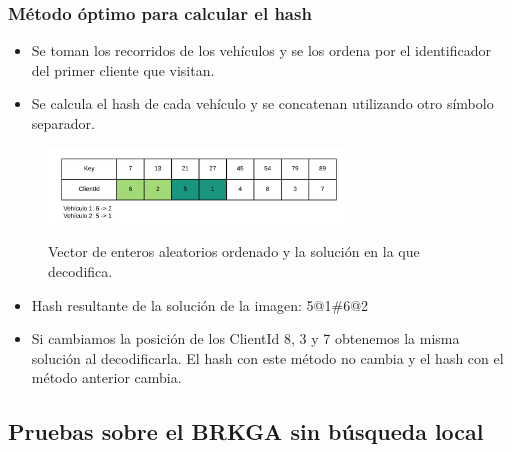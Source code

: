 \documentclass{beamer}
\begin{document}
\begin{frame}
\frametitle{Método óptimo para calcular el hash}

\begin{itemize}
    \item Se toman los recorridos de los vehículos y se los ordena por el identificador del primer cliente que visitan. 
    \item Se calcula el hash de cada vehículo y se concatenan utilizando otro símbolo separador.
    \pause
\end{itemize}

\begin{figure}[h]
	\caption{Vector de enteros aleatorios ordenado y la solución en la que decodifica.}
	\centering
	\includegraphics[width=8cm]{DistribucionClientesDecoSimple}
	\label{fig:DistribucionClientesDecoSimple2}
\end{figure}

\begin{itemize}
    \pause
    \item Hash resultante de la solución de la imagen: 5@1\#6@2
    \pause
    \item Si cambiamos la posición de los ClientId 8, 3 y 7 obtenemos la misma solución al decodificarla. El hash con este método no cambia y el hash con el método anterior cambia.
\end{itemize}

\end{frame}


\subsection{Pruebas sobre el BRKGA sin búsqueda local}
\end{document}
